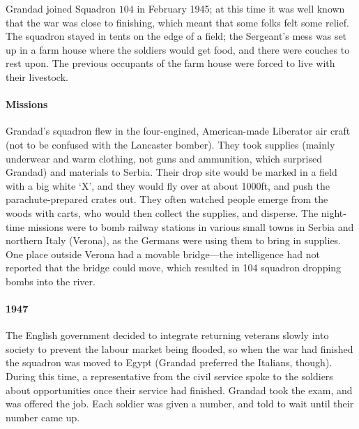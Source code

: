 Grandad joined Squadron $104$ in February 1945; at this time it was well known that
the war was close to finishing, which meant that some folks felt some relief. The
squadron stayed in tents on the edge of a field; the Sergeant's mess was set up
in a farm house where the soldiers would get food, and there were couches to rest upon.
The previous occupants of the farm house were forced to live with their livestock.

\paragraph{Missions} Grandad's squadron flew in the four-engined, American-made Liberator air craft (not to be
confused with the Lancaster bomber). They
took supplies (mainly underwear and warm clothing, not guns and ammunition, which surprised Grandad)
and materials to Serbia. Their drop site would
be marked in a field with a big white `X', and they would fly over at about 1000ft, and push
the parachute-prepared crates out. They often watched people emerge from the woods with carts,
who would then collect the supplies, and disperse.
The night-time missions were to bomb railway stations in various small towns in Serbia and northern Italy (Verona),
as the Germans were using them to bring in supplies. One place outside Verona had a movable bridge---the
intelligence had not reported that the bridge could move, which resulted in 104 squadron dropping bombs into
the river.

\paragraph{1947} The English government
decided to integrate returning veterans slowly into society to prevent the labour market being
flooded, so when the war had finished the squadron was moved to Egypt (Grandad preferred the Italians, though).
During this time, a
representative from the civil service spoke to the soldiers about opportunities once their
service had finished. Grandad took the exam, and was offered the job. Each soldier was given
a number, and told to wait until their number came up.
\begin{figure}
	\centering
\end{figure}

